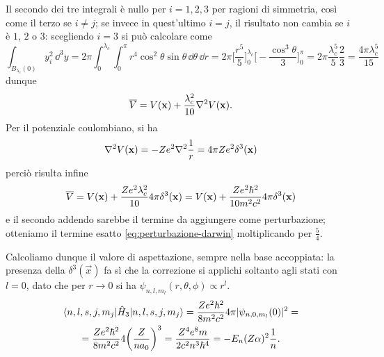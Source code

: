 Il secondo dei tre integrali è nullo per $i=1,2,3$ per ragioni di simmetria, cos\`i come il terzo se $i\ne j$; se invece in quest'ultimo $i=j$, il risultato non cambia se $i$ è $1$, $2$ o $3$: scegliendo $i=3$ si può calcolare come
\begin{equation}
    \int_{B_{\lambda_c}(0)}y_i^2\,\dd^3y=
    2\pi\int_0^{\lambda_c}\int_0^\pi r^4\cos^2\theta \sin\theta\,\dd\theta\,\dd r=
    2\pi\biggl[\frac{r^5}5\biggr]_0^{\lambda_c}\biggl[-\frac{\cos^3\theta}3\biggr]_0^\pi=
    2\pi\frac{\lambda_c^5}5\frac23=
    \frac{4\pi\lambda_c^5}{15}
\end{equation}
dunque
\begin{equation}
    \overline{V}=
    V(\mathbf{x})+\frac{\lambda_c^2}{10}\nabla^2 V(\mathbf{x}).
\end{equation}
Per il potenziale coulombiano, si ha
\begin{equation}
    \nabla^2 V(\mathbf{x})=
    -Ze^2\nabla^2\frac1{r}=
    4\pi Ze^2\delta^3(\mathbf{x})
\end{equation}
perciò risulta infine
\begin{equation}
    \overline{V}=
    V(\mathbf{x})+\frac{Ze^2\lambda_c^2}{10}4\pi\delta^3(\mathbf{x})=
    V(\mathbf{x})+\frac{Ze^2\hbar^2}{10m^2c^2}4\pi\delta^3(\mathbf{x})
\end{equation}
e il secondo addendo sarebbe il termine da aggiungere come perturbazione; otteniamo il termine esatto \eqref{eq:perturbazione-darwin} moltiplicando per $\frac54$.

Calcoliamo dunque il valore di aspettazione, sempre nella base accoppiata: la presenza della $\delta^3(\vec x)$ fa s\`i che la correzione si applichi soltanto agli stati con $l=0$, dato che per $r\to 0$ si ha $\psi_{n,l,m_l}(r,\theta,\phi)\propto r^l$.
\begin{multline}
    \langle n,l,s,j,m_j\rvert\hat{H}_3\lvert n,l,s,j,m_j\rangle=
    \frac{Ze^2\hbar^2}{8m^2c^2}4\pi\lvert\psi_{n,0,m_l}(0)\rvert^2=\\=
    \frac{Ze^2\hbar^2}{8m^2c^2}4\biggl(\frac{Z}{na_0}\biggr)^3=
    \frac{Z^4e^8m}{2c^2n^3\hbar^4}=
    -E_n(Z\alpha)^2\frac1{n}.
    \label{eq:correzione-darwin}
\end{multline}
